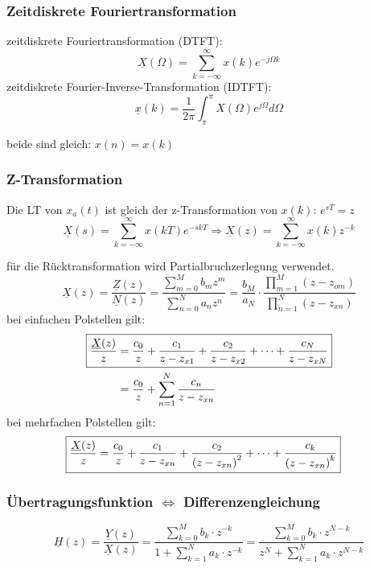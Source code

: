 \begin{multicols*}{2}
\subsubsection{Zeitdiskrete Fouriertransformation}
\begin{mdframed}[style=exercise,]
	zeitdiskrete Fouriertransformation (DTFT):
	\[
		\underline{X}(\Omega) = \sum_{k=-\infty}^{\infty} x(k)e^{-j\Omega k}
	\]
	zeitdiskrete Fourier-Inverse-Transformation (IDTFT):
	\[
		\underline{x}(k) = \frac{1}{2\pi}\int_{\pi}^{\pi} X(\Omega)e^{j\Omega} d\Omega
	\]

	\footnotesize
	beide sind gleich: $x(n)=x(k)$
\end{mdframed}
\subsubsection{Z-Transformation}
\begin{mdframed}[style=exercise]
	Die LT von $x_a(t)$ ist gleich der z-Transformation von $x(k)$:
	$e^{sT}=z$
	\[
		\underline{X}(s) = \sum_{k=-\infty}^{\infty} x(kT)e^{-skT} \Rightarrow \underline{X}(z) = \sum_{k=-\infty}^{\infty} x(k)z^{-k}
	\]
\end{mdframed}
für die Rücktransformation wird Partialbruchzerlegung verwendet.
\[
	\underline{X}(z)=\frac{\underline{Z}(z)}{\underline{N}(z)}=\frac{\sum_{m=0}^{M} b_{m} z^{m}}{\sum_{n=0}^{N} a_{n} z^{n}}=\frac{b_{M}}{a_{N}} \cdot \frac{\prod_{m=1}^{M}\left(z-z_{o m}\right)}{\prod_{n=1}^{N}\left(z-z_{x n}\right)}
\]
bei einfachen Polstellen gilt:
\begin{align*}
	\Aboxed{\frac{\underline{X}(z)}{z} & =\frac{c_{0}}{z}+\frac{c_{1}}{z-z_{x 1}}+\frac{c_{2}}{z-z_{x 2}}+\cdots+\frac{c_{N}}{z-z_{x N}}} \\
	                                   & =\frac{c_{0}}{z}+\sum_{n=1}^{N} \frac{c_{n}}{z-z_{x n}}
\end{align*}
bei mehrfachen Polstellen gilt:
\begin{align*}
	\Aboxed{\frac{\underline{X}(z)}{z}=\frac{c_{0}}{z}+\frac{c_{1}}{z-z_{x n}}+\frac{c_{2}}{\left(z-z_{x n}\right)^{2}}+\cdots+\frac{c_{k}}{\left(z-z_{x n}\right)^{k}}}
\end{align*}

\subsubsection{Übertragungsfunktion $\Leftrightarrow$ Differenzengleichung}
\[
	\underline{H}(z)=\frac{\underline{Y}(z)}{\underline{X}(z)}=\frac{\sum_{k=0}^{M} b_{k} \cdot z^{-k}}{1+\sum_{k=1}^{N} a_{k} \cdot z^{-k}}=\frac{\sum_{k=0}^{M} b_{k} \cdot z^{N-k}}{z^{N}+\sum_{k=1}^{N} a_{k} \cdot z^{N-k}}
\]


\end{multicols*}
